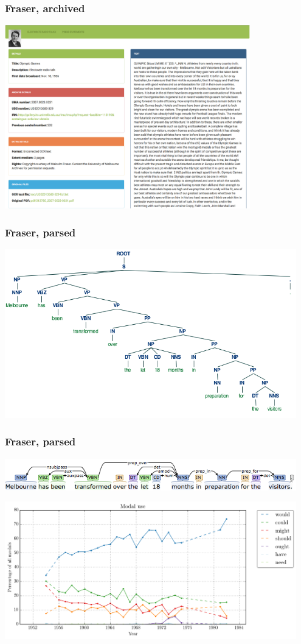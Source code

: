 \documentclass{beamer}       %
\begin{document}
\begin{frame}
    \frametitle{Fraser, archived}
    \centering
    \includegraphics[width=0.80\textwidth]{images/digfab}
\end{frame}


\begin{frame}
    \frametitle{Fraser, parsed}
    \centering
    \includegraphics[width=0.95\textwidth]{images/melbtree}
\end{frame}

\begin{frame}
    \frametitle{Fraser, parsed}
    \centering
    \includegraphics[width=0.95\textwidth]{images/melbdep}
\end{frame}

\begin{frame}
    \centering
    \includegraphics[width=0.95\textwidth]{images/modal-use.png}
\end{frame}
\end{document}
